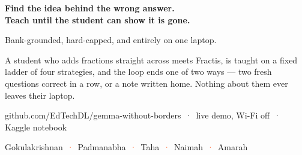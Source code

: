 \documentclass[aspectratio=169,11pt]{beamer}
\newcommand{\dimt}[1]{{\color{cream!62!gmbg}#1}}
\begin{document}
\begin{frame}
  \begin{center}
    \vspace{1.5em}
    {\fontsize{26}{32}\selectfont\bfseries\color{cream} Find the idea behind the wrong answer.\\
     Teach until the student can show it is gone.\par}
    \vspace{0.9em}
    {\Large\color{gold} Bank-grounded, hard-capped, and entirely on one laptop.\par}
    \vspace{1.1em}
    \dimt{\large A student who adds fractions straight across meets Fractis, is taught on a
    fixed ladder of four strategies, and the loop ends one of two ways --- two fresh questions
    correct in a row, or a note written home. Nothing about them ever leaves their laptop.}\par
    \vspace{1.3em}
    {\small\color{teal} github.com/EdTechDL/gemma-without-borders \,·\, live demo, Wi-Fi off \,·\, Kaggle notebook}\par
    \vspace{0.5em}
    {\small Gokulakrishnan \,\textcolor{coral}{·}\, Padmanabha \,\textcolor{coral}{·}\, Taha \,\textcolor{coral}{·}\, Naimah \,\textcolor{coral}{·}\, Amarah}
  \end{center}
\end{frame}
\end{document}
